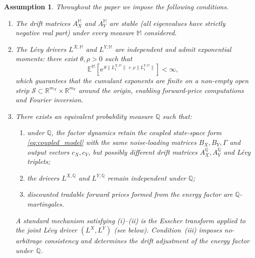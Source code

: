 \documentclass[10pt,a4paper,reqno]{amsart}
\newtheorem{assumption}[theorem]{Assumption}
\newcommand{\R}{\mathbb{R}}
\newcommand{\Q}{\mathbb{Q}}
\newcommand{\1}{\mathbbm{1}}
\newcommand{\ee}{\mathrm{e}}
\begin{document}
\begin{assumption}\label{ass:coupled_model}
Throughout the paper we impose the following conditions.
\begin{enumerate}[label=(\alph*)]
  \item\label{ass:stability} The drift matrices \(A_X^{\mathbb{M}}\) and
    \(A_Y^{\mathbb{M}}\) are stable (all eigenvalues have strictly negative real
    part) under every measure \(\mathbb{M}\) considered.
  \item\label{ass:moments} The Lévy drivers \(L^{X,\mathbb{M}}\) and
    \(L^{Y,\mathbb{M}}\) are independent and admit exponential moments: there
    exist \(\theta, \rho > 0\) such that
    \[
      \mathbb{E}^{\mathbb{M}}\!\left[
        \ee^{\,\theta\|L_1^{X,\mathbb{M}}\| + \rho\|L_1^{Y,\mathbb{M}}\|}
      \right] < \infty,
    \]
    which guarantees that the cumulant exponents are finite on a non-empty open
    strip \(\mathcal{S} \subset \R^{m_X} \times \R^{m_Y}\) around the origin,
    enabling forward-price computations and Fourier inversion.
  \item\label{ass:pricing_measure_main} There exists an equivalent probability
    measure \(\Q\) such that:
    \begin{enumerate}[label=(\roman*)]
      \item under \(\Q\), the factor dynamics retain the coupled state-space form
        \eqref{eq:coupled_model} with the same noise-loading matrices \(B_X,
        B_Y, \Gamma\) and output vectors \(c_X, c_Y\), but possibly different
        drift matrices \(A_X^\Q, A_Y^\Q\) and Lévy triplets;
      \item the drivers \(L^{X,\Q}\) and \(L^{Y,\Q}\) remain independent under
        \(\Q\);
      \item discounted tradable forward prices formed from the energy factor are
        \(\Q\)-martingales.
    \end{enumerate}
    A standard mechanism satisfying (i)--(ii) is the Esscher transform applied
    to the joint Lévy driver \((L^X,L^Y)\) (see 
    below). Condition~(iii) imposes no-arbitrage consistency and determines the
    drift adjustment of the energy factor under~\(\Q\).
\end{enumerate}
\end{assumption}
\end{document}
